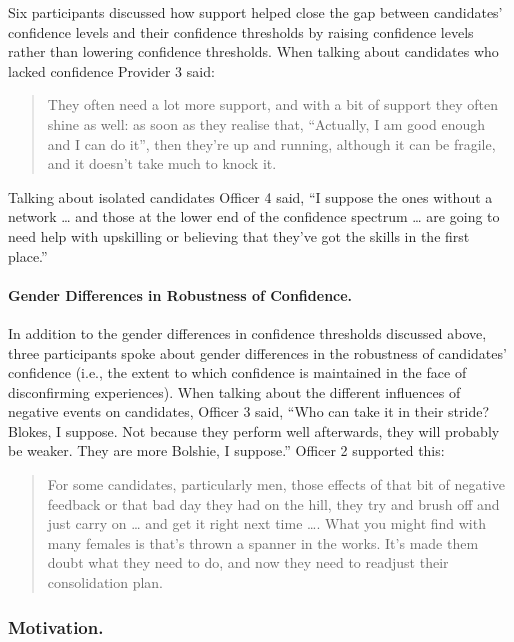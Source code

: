 \documentclass[
  12pt,
  a4paper,
]{book}
\begin{document}
Six participants discussed how support helped close the gap between candidates' confidence levels and their confidence thresholds by raising confidence levels rather than lowering confidence thresholds. When talking about candidates who lacked confidence Provider 3 said:

\begin{quote}
They often need a lot more support, and with a bit of support they often shine as well: as soon as they realise that, ``Actually, I am good enough and I can do it'', then they're up and running, although it can be fragile, and it doesn't take much to knock it.
\end{quote}

Talking about isolated candidates Officer 4 said, ``I suppose the ones without a network \ldots{} and those at the lower end of the confidence spectrum \ldots{} are going to need help with upskilling or believing that they've got the skills in the first place.''

\hypertarget{qual-gender-diffs-robsut-conf}{%
\paragraph{Gender Differences in Robustness of Confidence.}\label{qual-gender-diffs-robsut-conf}}

In addition to the gender differences in confidence thresholds discussed above, three participants spoke about gender differences in the robustness of candidates' confidence (i.e., the extent to which confidence is maintained in the face of disconfirming experiences). When talking about the different influences of negative events on candidates, Officer 3 said, ``Who can take it in their stride? Blokes, I suppose. Not because they perform well afterwards, they will probably be weaker. They are more Bolshie, I suppose.'' Officer 2 supported this:

\begin{quote}
For some candidates, particularly men, those effects of that bit of negative feedback or that bad day they had on the hill, they try and brush off and just carry on \ldots{} and get it right next time \ldots. What you might find with many females is that's thrown a spanner in the works. It's made them doubt what they need to do, and now they need to readjust their consolidation plan.
\end{quote}

\hypertarget{qual-gta-motivation}{%
\subsubsection{Motivation.}\label{qual-gta-motivation}}
\end{document}
